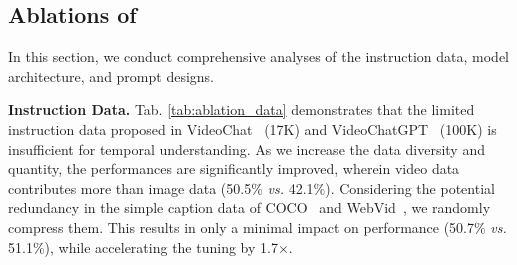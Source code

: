 \begin{table}[tp]
    \centering
    \setlength\tabcolsep{2.5pt}
    \vspace{-0.3cm}
    \caption{\textbf{Training Method.} \ice and\fire refer to freezing and tuning.
    We efficiently freeze the visual encoder in Stage1 and LLM in all stages,
    while tuning the visual encoder and QFormer in Stage2\&3.
    }
    \label{tab:ablation_training}
    \vspace{-0.3cm}
\end{table}

\subsection{Ablations of \ModelName}
\label{sec:ablation}
In this section, we conduct comprehensive analyses of the instruction data, model architecture, and prompt designs.

\textbf{Instruction Data.}
Tab. \ref{tab:ablation_data} demonstrates that the limited instruction data proposed in VideoChat~\cite{videochat} (17K) and VideoChatGPT~\cite{videochatgpt} (100K) is insufficient for temporal understanding. 
As we increase the data diversity and quantity, 
the performances are significantly improved, 
wherein video data contributes more than image data (50.5\% \textit{vs.} 42.1\%). 
Considering the potential redundancy in the simple caption data of COCO~\cite{coco} and WebVid~\cite{bain2021frozen}, 
we randomly compress them. 
This results in only a minimal impact on performance (50.7\% \textit{vs.} 51.1\%), 
while accelerating the tuning by 1.7$\times$.


